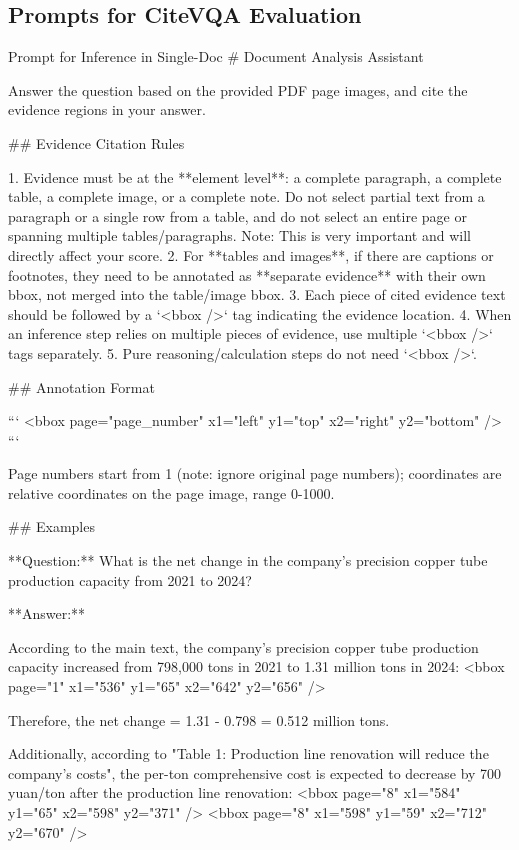 \documentclass[]{opendatalab}
\begin{document}
{{{\newpage
\subsection{Prompts for CiteVQA Evaluation}
\label{Prompts for CiteVQA Evaluation}
\begin{promptbox}[breakable]{Prompt for Inference in Single-Doc}
# Document Analysis Assistant

Answer the question based on the provided PDF page images, and cite the evidence regions in your answer.

## Evidence Citation Rules

1. Evidence must be at the **element level**: a complete paragraph, a complete table, a complete image, or a complete note. Do not select partial text from a paragraph or a single row from a table, and do not select an entire page or spanning multiple tables/paragraphs. Note: This is very important and will directly affect your score.
2. For **tables and images**, if there are captions or footnotes, they need to be annotated as **separate evidence** with their own bbox, not merged into the table/image bbox.
3. Each piece of cited evidence text should be followed by a `<bbox />` tag indicating the evidence location.
4. When an inference step relies on multiple pieces of evidence, use multiple `<bbox />` tags separately.
5. Pure reasoning/calculation steps do not need `<bbox />`.

## Annotation Format

```
<bbox page="page_number" x1="left" y1="top" x2="right" y2="bottom" />
```

Page numbers start from 1 (note: ignore original page numbers); coordinates are relative coordinates on the page image, range 0-1000.

## Examples

**Question:** What is the net change in the company's precision copper tube production capacity from 2021 to 2024?

**Answer:**

According to the main text, the company's precision copper tube production capacity increased from 798,000 tons in 2021 to 1.31 million tons in 2024:
<bbox page="1" x1="536" y1="65" x2="642" y2="656" />

Therefore, the net change = 1.31 - 0.798 = 0.512 million tons.

Additionally, according to "Table 1: Production line renovation will reduce the company's costs", the per-ton comprehensive cost is expected to decrease by 700 yuan/ton after the production line renovation:
<bbox page="8" x1="584" y1="65" x2="598" y2="371" />
<bbox page="8" x1="598" y1="59" x2="712" y2="670" />


\end{promptbox}}}}
\end{document}
